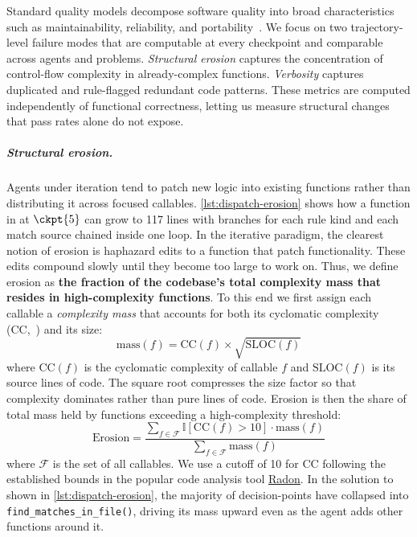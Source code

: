 Standard quality models decompose software quality into broad characteristics such as
maintainability, reliability, and portability~\citep{iso25010}. We focus on two
trajectory-level failure modes that are computable at every checkpoint and comparable
across agents and problems. \emph{Structural erosion} captures the concentration of
control-flow complexity in already-complex functions. \emph{Verbosity} captures
duplicated and rule-flagged redundant code patterns. These metrics are computed
independently of functional correctness, letting us measure structural changes that
pass rates alone do not expose.

\subparagraph{Structural erosion.} Agents under iteration tend to patch new logic into existing functions rather than distributing it across focused callables. \autoref{lst:dispatch-erosion} shows how a function in \codesearch{} at $\ckpt{5}$ can grow to 117 lines with branches for each rule kind and each match source chained inside one loop. In the iterative paradigm, the clearest notion of erosion is haphazard edits to a function that patch functionality. These edits compound slowly until they become too large to work on. Thus, we define erosion as \textbf{the fraction of the codebase's total complexity mass that resides in high-complexity functions}. To this end we first assign each callable a \emph{complexity mass} that accounts for both its cyclomatic complexity (CC,~\citep{mccabe1976-complexity}) and its size:
\begin{equation}
\label{eq:mass} 
\text{mass}(f) = \text{CC}(f) \times \sqrt{\text{SLOC}(f)}
\end{equation}
where $\text{CC}(f)$ is the cyclomatic complexity of callable $f$ and $\text{SLOC}(f)$ is its source lines of code. The square root compresses the size factor so that complexity dominates rather than pure lines of code. Erosion is then the share of total mass held by functions exceeding a high-complexity threshold:
\begin{equation}
\label{eq:erosion}
\text{Erosion}
=  \frac{\sum_{f \in \mathcal{F}} \mathbb{I}[\text{CC}(f) > 10]\cdot\text{mass}(f)}{\sum_{f \in \mathcal{F}} \text{mass}(f)}
\end{equation}
where $\mathcal{F}$ is the set of all callables. We use a cutoff of 10 for CC following the established bounds in the popular code analysis tool \href{https://radon.readthedocs.io/en/latest/}{Radon}. In the solution to \codesearch{} shown in \autoref{lst:dispatch-erosion}, the majority of decision-points have collapsed into \texttt{find\_matches\_in\_file()}, driving its mass upward even as the agent adds other functions around it.

